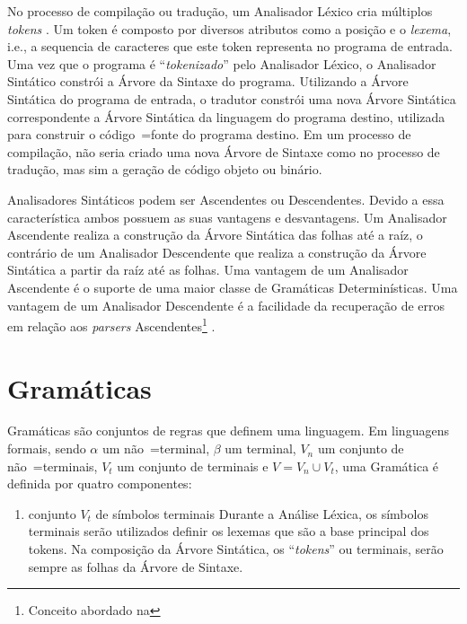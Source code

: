 {    No processo de compilação ou tradução,
    um Analisador Léxico cria múltiplos \textit{tokens} \cite{ahoCompilerDragonBook}.
    Um token é composto por diversos atributos como a posição e
    o \textit{lexema}, i.e.,
    a sequencia de caracteres que este token representa no programa de entrada.
    Uma vez que o programa é ``\textit{tokenizado}'' pelo Analisador Léxico,
    o Analisador Sintático constrói a Árvore da Sintaxe do programa.
    Utilizando a Árvore Sintática do programa de entrada,
    o tradutor constrói uma nova Árvore Sintática correspondente a
    Árvore Sintática da linguagem do programa destino,
    utilizada para construir o código~=fonte do programa destino.
    Em um processo de compilação,
    não seria criado uma nova Árvore de Sintaxe como no processo de tradução,
    mas sim a geração de código objeto ou binário.

    Analisadores Sintáticos podem ser Ascendentes ou Descendentes.
    Devido a essa característica ambos possuem as suas vantagens e
    desvantagens.
    Um Analisador Ascendente realiza a construção da Árvore Sintática das folhas até a raíz,
    o contrário de um Analisador Descendente que realiza a construção
    da Árvore Sintática a partir da raíz até as folhas.
    Uma vantagem de um Analisador Ascendente é o suporte
    de uma maior classe de Gramáticas Determinísticas.
    Uma vantagem de um Analisador Descendente é a facilidade da recuperação de erros em
    relação aos \textit{parsers} Ascendentes\footnote{Conceito abordado na
    } \cite{sippu1982,lr1ErrorRecovery,larkJosefGrosch}.


\section{Gramáticas}

    Gramáticas são conjuntos de regras que definem uma linguagem.
    Em linguagens formais,
    sendo $\alpha$ um não~=terminal,
    $\beta$ um terminal,
    $V_n$ um conjunto de não~=terminais,
    $V_t$ um conjunto de terminais e
    $V = V_n \cup V_t$,
    uma Gramática é definida por quatro componentes:
    \begin{enumerate}%
        \item {} conjunto $V_t$ de símbolos terminais
        Durante a Análise Léxica,
        os símbolos terminais serão utilizados definir os lexemas que são a base principal dos tokens.
        Na composição da Árvore Sintática,
        os ``\textit{tokens}'' ou terminais,
        serão sempre as folhas da Árvore de Sintaxe.


\end{enumerate}}
